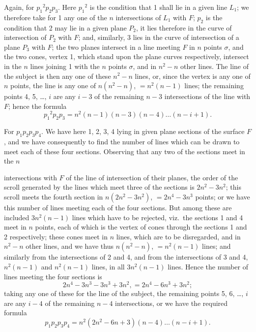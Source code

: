 \documentclass[11pt,a4paper]{book}
\begin{document}
Again, for ${p_1}^2p_2p_3$. Here ${p_1}^2$ is the condition that 1 shall lie in a given line $L_1$; we therefore take for 1 any one of the $n$ intersections of $L_1$ with $F$; $p_2$ is the condition that 2 may lie in a given plane $P_2$, it lies therefore in the curve of intersection of $P_2$ with $F$; and, similarly, 3 lies in the curve of intersection of a plane $P_3$ with $F$; the two planes intersect in a line meeting $F$ in $n$ points $\sigma$, and the two cones, vertex 1, which stand upon the plane curves respectively, intersect in the $n$ lines joining 1 with the $n$ points $\sigma$, and in $n^2 - n$ other lines. The line of the subject is then any one of these $n^2 - n$ lines, or, since the vertex is any one of $n$ points, the line is any one of $n(n^2 - n)$, $= n^2(n-1)$ lines; the remaining points 4, 5, \ldots, $i$ are any $i-3$ of the remaining $n-3$ intersections of the line with $F$; hence the formula
\[
{p_1}^2p_2p_3 = n^2(n-1)(n-3)(n-4)\ldots(n-i+1).
\]

For $p_1p_2p_3p_4$. We have here 1, 2, 3, 4 lying in given plane sections of the surface $F$, and we have consequently to find the number of lines which can be drawn to meet each of these four sections. Observing that any two of the sections meet in the $n$

\newpage
\noindent intersections with $F$ of the line of intersection of their planes, the order of the scroll generated by the lines which meet three of the sections is $2n^2 - 3n^2$; this scroll meets the fourth section in $n(2n^2 - 3n^2)$, $= 2n^4 - 3n^3$ points; or we have this number of lines meeting each of the four sections. But among these are included $3n^2(n-1)$ lines which have to be rejected, viz.\ the sections 1 and 4 meet in $n$ points, each of which is the vertex of cones through the sections 1 and 2 respectively; these cones meet in $n$ lines, which are to be disregarded, and in $n^2 - n$ other lines, and we have thus $n(n^2 - n)$, $= n^2(n-1)$ lines; and similarly from the intersections of 2 and 4, and from the intersections of 3 and 4, $n^2(n-1)$ and $n^2(n-1)$ lines, in all $3n^2(n-1)$ lines. Hence the number of lines meeting the four sections is
\[
2n^4 - 3n^3 - 3n^3 + 3n^2, = 2n^4 - 6n^3 + 3n^2;
\]
taking any one of these for the line of the subject, the remaining points 5, 6, \ldots, $i$ are any $i-4$ of the remaining $n-4$ intersections, or we have the required formula
\[
p_1p_2p_3p_4 = n^2(2n^2 - 6n + 3)(n-4)\ldots(n-i+1).
\]
\end{document}
